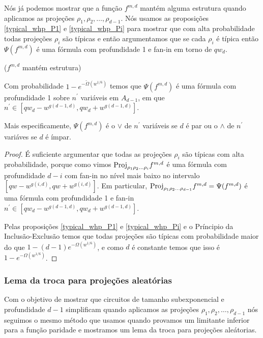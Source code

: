 Nós já podemos mostrar que a função $f^{m, d}$ mantém alguma estrutura quando aplicamos as projeções $\rho_{1}, \rho_{2}, \dots, \rho_{d - 1}$. Nós usamos as proposições \ref{typical_whp_P1} e \ref{typical_whp_Pi} para mostrar que com alta probabilidade todas projeções $\rho_{i}$ são típicas e então argumentamos que se cada $\rho_{i}$ é típica então $\Psi(f^{m, d})$ é uma fórmula com profundidade 1 e fan-in em torno de $qw_{d}$.

\begin{prop} ($f^{m, d}$ mantém estrutura) \label{struct_preserve}

Com probabilidade $1 - e^{-\widetilde{\Omega}(w^{1/6})}$ temos que $\Psi(f^{m, d})$ é uma fórmula com profundidade 1 sobre $n^{\prime}$ variáveis em $A_{d - 1}$, em que $n^{\prime} \in [qw_{d} - w^{g(d - 1, d)}, qw_{d} + w^{g(d -1, d)}]$.

Mais especificamente, $\Psi(f^{m, d})$ é o $\lor$ de $n^{\prime}$ variáveis se $d$ é par ou o $\land$ de $n^{\prime}$ variáves se $d$ é ímpar.

\end{prop}

\begin{proof}

É suficiente argumentar que todas as projeções $\rho_{i}$ são típicas com alta probabilidade, porque como vimos $\text{Proj}_{\rho_{1}\rho_{2}\dots\rho_{i}}f^{m, d}$ é uma fórmula com profundidade $d - i$ com fan-in no nível mais baixo no intervalo $[qw - w^{g(i, d)}, qw + w^{g(i, d)}]$. Em particular, $\text{Proj}_{\rho_{1}\rho_{2}\dots\rho_{d - 1}}f^{m, d} = \Psi(f^{m, d})$ é uma fórmula com profundidade 1 e fan-in $n^{\prime} \in [qw_{d} - w^{g(d - 1, d)}, qw_{d} + w^{g(d - 1, d)}]$.

Pelas proposições \ref{typical_whp_P1} e \ref{typical_whp_Pi} e o Príncipio da Inclusão-Exclusão temos que todas projeções são típicas com probabilidade maior do que $1 - (d - 1)e^{-\Omega(w^{1/6})}$, e como $d$ é constante temos que isso é $1 - e^{-\Omega(w^{1/6})}$. 

\end{proof}

\subsubsection{Lema da troca para projeções aleatórias}

Com o objetivo de mostrar que circuitos de tamanho subexponencial e profundidade $d - 1$ simplificam quando aplicamos as projeções $\rho_{1}, \rho_{2}, \dots, \rho_{d - 1}$ nós seguimos o mesmo método que usamos quando provamos um limitante inferior para a função paridade e mostramos um lema da troca para projeções aleátorias.

